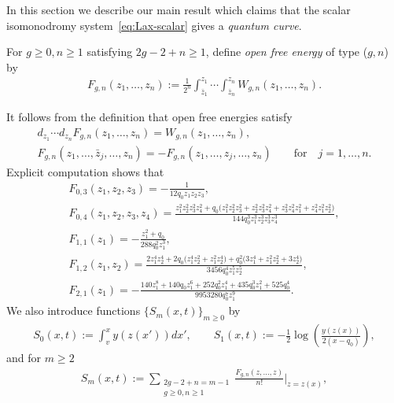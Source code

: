 In this section we describe our main result which claims
that the scalar isomonodromy system~\eqref{eq:Lax-scalar}
gives a {\em quantum curve}.

\begin{Def}
For $g \ge 0, n \ge 1$ satisfying $2g-2+n \ge 1$,
def\/ine {\em open free energy} of type ($g,n$) by
\begin{gather} \label{eq:open-Fgn}
F_{g,n}(z_{1},\dots,z_{n}) :=
\frac{1}{2^{n}} \int^{z_{1}}_{\bar{z}_{1}}\cdots
\int^{z_{n}}_{\bar{z}_{n}} W_{g,n}(z_{1},\dots,z_{n}).
\end{gather}
\end{Def}

It follows from the def\/inition that open free energies satisfy
\begin{gather*}
d_{z_{1}}\cdots d_{z_{n}} F_{g,n}(z_{1},\dots,z_{n})   =
W_{g,n}(z_{1},\dots,z_{n}), \\
F_{g,n}(z_{1},\dots,\bar{z}_{j}, \dots,z_{n})   =
- F_{g,n}(z_{1},\dots, z_{j}, \dots,z_{n})
\qquad \text{for} \quad j=1,\dots,n.
\end{gather*}
Explicit computation shows that
\begin{gather*}
F_{0,3}(z_{1},z_{2},z_{3})   =   -\frac{1}{12q_{0}z_{1}z_{2}z_{3}}, \\
F_{0,4}(z_{1},z_{2},z_{3},z_{4})   =
\frac{z_{1}^{2}z_{2}^{2}z_{3}^{2}z_{4}^{2} + q_{0}\bigl(
z_{1}^{2}z_{2}^{2}z_{3}^{2} + z_{2}^{2}z_{3}^{2}z_{4}^{2} +
z_{3}^{2}z_{4}^{2}z_{1}^{2} + z_{4}^{2}z_{1}^{2}z_{2}^{2} \bigr)}
{144q_{0}^{3}z_{1}^{3}z_{2}^{3}z_{3}^{3}z_{4}^{3}},
\\
F_{1,1}(z_{1})  =  -\frac{z_{1}^{2}+q_{0}}{288q_{0}^{2} z_{1}^{3}}, \\
%
F_{1,2}(z_{1},z_{2}) =
\frac{2z_{1}^{4}z_{2}^{4} +
2q_{0}\bigl( z_{1}^{4}z_{2}^{2} + z_{1}^{2}z_{2}^{4} \bigr) +
q_{0}^{2}\bigl( 3z_{1}^{4} + z_{1}^{2}z_{2}^{2} + 3z_{2}^{4} \bigr)}
{3456q_{0}^{4}z_{1}^{5}z_{2}^{5}}, \\
%
F_{2,1}(z_{1})  =
-\frac{140z_{1}^{8} + 140 q_{0} z_{1}^6 + 252 q_{0}^{2} z_{1}^4
+ 435 q_{0}^{3} z_{1}^2 + 525 q_{0}^{4}}
{9953280 q_{0}^{7} z_{1}^{9}}.
\end{gather*}
We also introduce functions $\{ S_{m}(x,t) \}_{m \ge 0}$ by
\begin{gather*} %
S_{0}(x,t) := \int^{x}_{v} y(z(x'))dx', \qquad
S_{1}(x,t) := -\frac{1}{2} \log \left(\frac{y(z(x))}{2(x-q_{0})}
\right),
\end{gather*}
and for $m \ge 2$
\begin{gather*} %
S_{m}(x,t) := \sum_{\substack{2g-2+n=m-1 \\ g\ge0, n\ge 1}}
\frac{F_{g,n}(z,\dots,z)}{n!} \biggr|_{z=z(x)},
\end{gather*}
